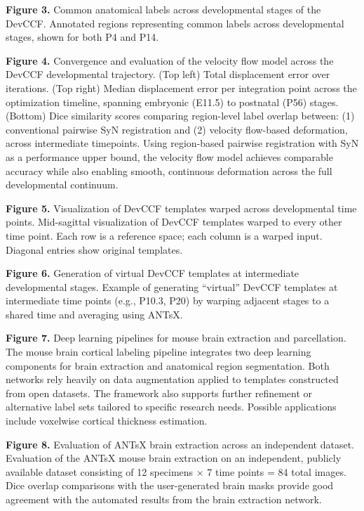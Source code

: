 \documentclass[
  12pt,
]{article}
\begin{document}
\textbf{Figure 3.} Common anatomical labels across developmental stages
of the DevCCF. Annotated regions representing common labels across
developmental stages, shown for both P4 and P14.

\textbf{Figure 4.} Convergence and evaluation of the velocity flow model
across the DevCCF developmental trajectory. (Top left) Total
displacement error over iterations. (Top right) Median displacement
error per integration point across the optimization timeline, spanning
embryonic (E11.5) to postnatal (P56) stages. (Bottom) Dice similarity
scores comparing region-level label overlap between: (1) conventional
pairwise SyN registration and (2) velocity flow-based deformation,
across intermediate timepoints. Using region-based pairwise registration
with SyN as a performance upper bound, the velocity flow model achieves
comparable accuracy while also enabling smooth, continuous deformation
across the full developmental continuum.

\textbf{Figure 5.} Visualization of DevCCF templates warped across
developmental time points. Mid-sagittal visualization of DevCCF
templates warped to every other time point. Each row is a reference
space; each column is a warped input. Diagonal entries show original
templates.

\textbf{Figure 6.} Generation of virtual DevCCF templates at
intermediate developmental stages. Example of generating ``virtual''
DevCCF templates at intermediate time points (e.g., P10.3, P20) by
warping adjacent stages to a shared time and averaging using ANTsX.

\textbf{Figure 7.} Deep learning pipelines for mouse brain extraction
and parcellation. The mouse brain cortical labeling pipeline integrates
two deep learning components for brain extraction and anatomical region
segmentation. Both networks rely heavily on data augmentation applied to
templates constructed from open datasets. The framework also supports
further refinement or alternative label sets tailored to specific
research needs. Possible applications include voxelwise cortical
thickness estimation.

\textbf{Figure 8.} Evaluation of ANTsX brain extraction across an
independent dataset. Evaluation of the ANTsX mouse brain extraction on
an independent, publicly available dataset consisting of 12 specimens
\(\times\) 7 time points = 84 total images. Dice overlap comparisons
with the user-generated brain masks provide good agreement with the
automated results from the brain extraction network.
\end{document}
